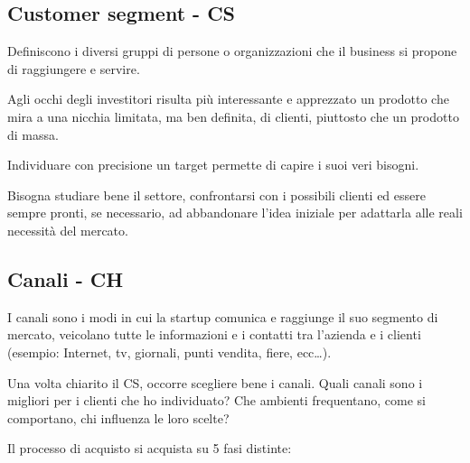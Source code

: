 \subsection{Customer segment - CS}

Definiscono i diversi gruppi di persone o organizzazioni che il business si
propone di raggiungere e servire.

Agli occhi degli investitori risulta più interessante e apprezzato un prodotto
che mira a una nicchia limitata, ma ben definita, di clienti, piuttosto che un
prodotto di massa.

Individuare con precisione un target permette di capire i suoi veri bisogni.

Bisogna studiare bene il settore, confrontarsi con i possibili clienti ed
essere sempre pronti, se necessario, ad abbandonare l'idea iniziale per
adattarla alle reali necessità del mercato.

\subsection{Canali - CH}

I canali sono i modi in cui la startup comunica e raggiunge il suo segmento
di mercato, veicolano tutte le informazioni e i contatti tra l'azienda e i
clienti (esempio: Internet, tv, giornali, punti vendita, fiere, ecc\dots).

Una volta chiarito il CS, occorre scegliere bene i canali. Quali canali sono
i migliori per i clienti che ho individuato? Che ambienti frequentano, come
si comportano, chi influenza le loro scelte?

Il processo di acquisto si acquista su 5 fasi distinte:

